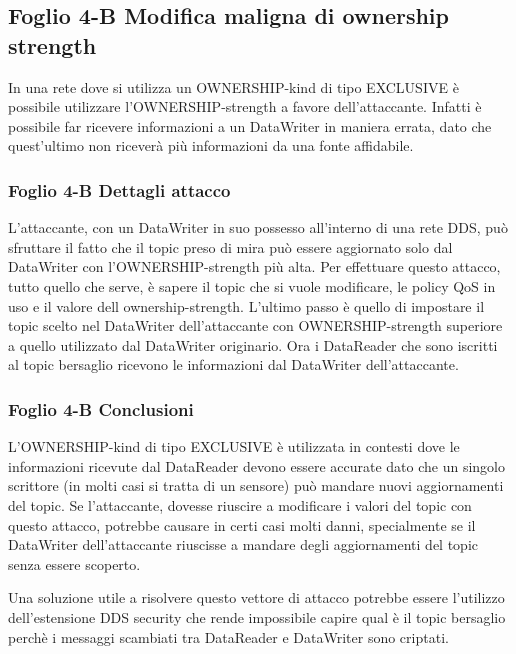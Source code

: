 



\subsection{Foglio 4-B Modifica maligna di ownership strength}
In una rete dove si utilizza un OWNERSHIP-kind di tipo EXCLUSIVE è possibile
utilizzare l'OWNERSHIP-strength a favore
dell'attaccante. Infatti è possibile far ricevere informazioni a un DataWriter
in maniera errata, dato che quest'ultimo non riceverà più informazioni da
una fonte affidabile.


\subsubsection{Foglio 4-B Dettagli attacco}
L'attaccante, con un DataWriter in suo possesso all'interno di una rete DDS,
può sfruttare il fatto che il topic preso di mira può essere aggiornato
solo dal DataWriter con l'OWNERSHIP-strength più alta.
Per effettuare questo attacco, tutto quello che serve, è sapere il topic che
si vuole modificare, le policy QoS in uso e il valore dell ownership-strength.
L'ultimo passo è quello di impostare il topic scelto nel DataWriter
dell'attaccante con OWNERSHIP-strength superiore a quello utilizzato dal
DataWriter originario.
Ora i DataReader che sono iscritti al topic bersaglio
ricevono le informazioni dal DataWriter dell'attaccante.


\subsubsection{Foglio 4-B Conclusioni}
L'OWNERSHIP-kind di tipo EXCLUSIVE è utilizzata in contesti dove le
informazioni ricevute dal DataReader devono essere accurate dato che un singolo
scrittore (in molti casi si tratta di un sensore) può mandare nuovi aggiornamenti
del topic. Se l'attaccante, dovesse riuscire a modificare i valori del topic con
questo attacco, potrebbe causare in certi casi molti danni,
specialmente se il DataWriter dell'attaccante riuscisse a mandare degli aggiornamenti
del topic senza essere scoperto.


Una soluzione utile a risolvere questo vettore di attacco potrebbe essere l'utilizzo
dell'estensione DDS security che rende impossibile capire qual è il topic bersaglio
perchè i messaggi scambiati tra DataReader e DataWriter sono criptati.


